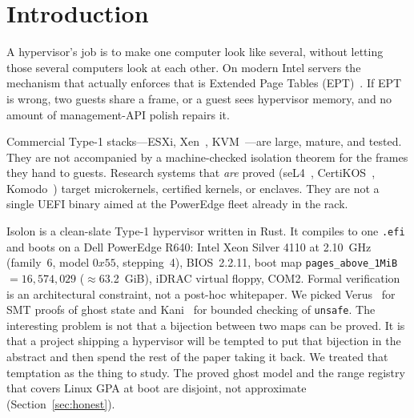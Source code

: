 \documentclass[sigplan,10pt,anonymous]{acmart}
\begin{document}


\maketitle

\section{Introduction}

A hypervisor's job is to make one computer look like several, without letting
those several computers look at each other. On modern Intel servers the
mechanism that actually enforces that is Extended Page Tables
(EPT)~\cite{intel-sdm}. If EPT is wrong, two guests share a frame, or a
guest sees hypervisor memory, and no amount of management-API polish repairs
it.

Commercial Type-1 stacks---ESXi, Xen~\cite{barham2003xen},
KVM~\cite{kivity2007kvm}---are large, mature, and tested. They are not
accompanied by a machine-checked isolation theorem for the frames they hand
to guests. Research systems that \emph{are} proved
(seL4~\cite{klein2009sel4,klein2014comprehensive},
CertiKOS~\cite{gu2016certikos}, Komodo~\cite{ferraiuolo2017komodo}) target
microkernels, certified kernels, or enclaves. They are not a single UEFI
binary aimed at the PowerEdge fleet already in the rack.

Isolon is a clean-slate Type-1 hypervisor written in Rust. It compiles to
one \texttt{.efi} and boots on a Dell PowerEdge R640: Intel Xeon Silver 4110
at 2.10~GHz (family~6, model $0x55$, stepping~4), BIOS~2.2.11, boot map
\texttt{pages\_above\_1MiB}${=}16{,}574{,}029$ ($\approx$63.2~GiB), iDRAC
virtual floppy, COM2. Formal verification is an architectural constraint, not
a post-hoc whitepaper. We picked Verus~\cite{lattuada2023verus,lattuada2024verus}
for SMT proofs of ghost state and Kani~\cite{delmas2026kani,kroening2014cbmc}
for bounded checking of \texttt{unsafe}. The interesting problem is not
that a bijection between two maps can be proved. It is that a project
shipping a hypervisor will be tempted to put that bijection in the
abstract and then spend the rest of the paper taking it back. We treated
that temptation as the thing to study. The proved ghost model and the
range registry that covers Linux GPA at boot are disjoint, not
approximate (Section~\ref{sec:honest}).
\end{document}
